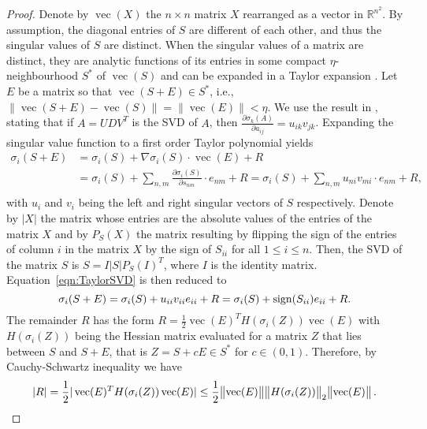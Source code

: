 \documentclass[11pt]{article}
\DeclareMathOperator{\vect}{vec}
\begin{document}
\begin{proof}     
Denote by $\vect(X)$ the $n \times n$ matrix $X$ rearranged as a vector in $\mathbb{R}^{n^2}$. By assumption, the diagonal entries of $S$ are different of each other, and thus the singular values of $S$ are distinct. When the singular values of a matrix are distinct, they are analytic functions of its entries in some compact $\eta$-neighbourhood $S^*$ of $\vect(S)$ and can be expanded in a Taylor expansion \cite{magnus1985differentiating}. Let $E$ be a matrix so that $\vect(S+E) \in S^*$, i.e., $\|\vect(S + E) - \vect(S)\| = \|\vect(E)\| < \eta$. We use the result in \cite{papadopoulo2000estimating}, stating that if $A = UDV^T$ is the SVD of $A$, then $\frac{\partial \sigma_k(A)}{\partial a_{ij}} = u_{ik}v_{jk}$. Expanding the singular value function to a first order Taylor polynomial yields
\begin{equation} \label{eqn:TaylorSVD}
\begin{split}
\sigma_i(S+E) & = \sigma_i(S) + \nabla\sigma_i(S) \cdot \vect(E) + R \\
& = \sigma_i(S) + \sum_{n,m}\frac{\partial \sigma_i(S)}{\partial s_{nm}} \cdot e_{nm} + R = \sigma_i(S) + \sum_{n,m} u_{ni}v_{mi}\cdot e_{nm} + R ,\\
\end{split}
\end{equation}
with $u_i$ and $v_i$ being the left and right singular vectors of $S$ respectively.
Denote by $|X|$ the matrix whose entries are the absolute values of the entries of the matrix $X$ and by $P_S(X)$ the matrix resulting by flipping the sign of the entries of column $i$ in the matrix $X$ by the sign of $S_{ii}$ for all $1 \leq i \leq n$. Then, the SVD of the matrix $S$ is $S = I|S|P_S(I)^T$, where $I$ is the identity matrix. Equation~\eqref{eqn:TaylorSVD} is then reduced to
\begin{equation}
\sigma_i(S+E) = \sigma_i(S) +  u_{ii}v_{ii} e_{ii} + R  = \sigma_i(S) +  \operatorname{sign}(S_{ii})e_{ii} + R .\\
\end{equation}
The remainder $R$ has the form $R = \frac12 \vect(E)^T H(\sigma_i(Z)) \vect(E)$ with $H(\sigma_i(Z))$ being the Hessian matrix evaluated for a matrix $Z$ that lies between $S$ and $S + E$, that is $Z = S + cE \in S^*$ for $c \in (0,1)$. Therefore, by Cauchy-Schwartz inequality we have
\begin{equation}
|R| = \frac12 |\vect(E)^TH(\sigma_i(Z))\vect(E)|  \le \frac12 \norm{\vect(E)}\norm{H(\sigma_i(Z))}_2\norm{\vect(E)}. 
\end{equation}


\end{proof}
\end{document}
